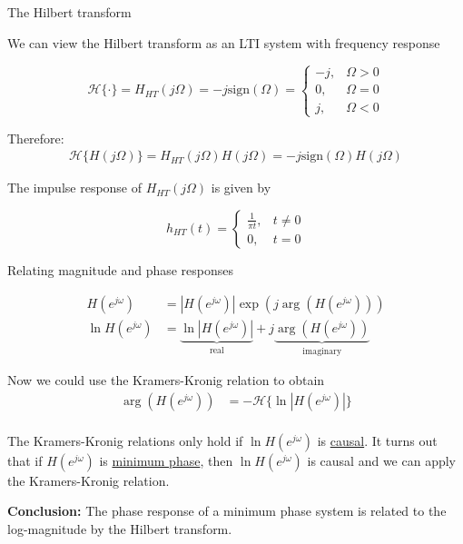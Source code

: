 \documentclass[10pt]{beamer}
\begin{document}
\begin{frame}{The Hilbert transform}

We can view the Hilbert transform as an LTI system with frequency response

\begin{equation*}
\mathcal{H}\{\cdot\} = H_{HT}(j\Omega) = -j\mathrm{sign}(\Omega) = \begin{cases}
-j, & \Omega > 0 \\
0, & \Omega = 0 \\
j, & \Omega < 0
\end{cases}
\end{equation*}

Therefore:
\begin{align*}
\mathcal{H}\{H(j\Omega)\} = H_{HT}(j\Omega)H(j\Omega) = -j\mathrm{sign}(\Omega)H(j\Omega)
\end{align*}


The impulse response of $H_{HT}(j\Omega)$ is given by

\begin{equation*}
h_{HT}(t) = \begin{cases}
\frac{1}{\pi t}, & t \neq 0 \\
0, & t = 0
\end{cases}
\end{equation*}
\end{frame}

\begin{frame}{Relating magnitude and phase responses}

\begin{align*}
H(e^{j\omega}) &= |H(e^{j\omega})|\exp(j\arg(H(e^{j\omega}))) \\
\ln H(e^{j\omega}) &= \underbrace{\ln |H(e^{j\omega})|}_{\text{real}} + j\underbrace{\arg(H(e^{j\omega}))}_{\text{imaginary}} \tag{taking $\ln$ of both sides}
\end{align*}

Now we could use the Kramers-Kronig relation to obtain
\begin{align*}
\arg(H(e^{j\omega})) &= -\mathcal{H}\{\ln |H(e^{j\omega})|\} \\
\end{align*}

The Kramers-Kronig relations only hold if $\ln H(e^{j\omega})$ is \underline{causal}. It turns out that if $H(e^{j\omega})$ is \underline{minimum phase}, then  $\ln H(e^{j\omega})$ is causal and we can apply the Kramers-Kronig relation.

\textbf{Conclusion:} The phase response of a minimum phase system is related to the  log-magnitude by the Hilbert transform.


\end{frame}
\end{document}

